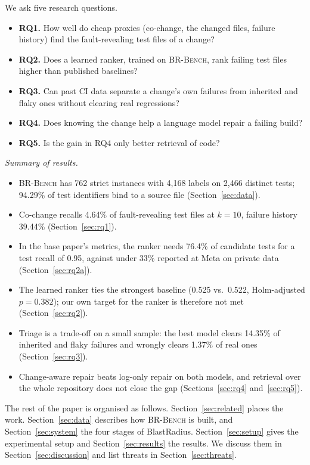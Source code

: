\documentclass[10pt,conference]{IEEEtran}
\newcommand{\brb}{\textsc{BR-Bench}}
\begin{document}
We ask five research questions.
\begin{itemize}
\item \textbf{RQ1.} How well do cheap proxies (co-change, the changed files, failure history) find the fault-revealing test files of a change?
\item \textbf{RQ2.} Does a learned ranker, trained on \brb{}, rank failing test files higher than published baselines?
\item \textbf{RQ3.} Can past CI data separate a change's own failures from inherited and flaky ones without clearing real regressions?
\item \textbf{RQ4.} Does knowing the change help a language model repair a failing build?
\item \textbf{RQ5.} Is the gain in RQ4 only better retrieval of code?
\end{itemize}

\textit{Summary of results.}
\begin{itemize}
\item \brb{} has 762 strict instances with 4,168 labels on 2,466 distinct tests; 94.29\% of test identifiers bind to a source file (Section~\ref{sec:data}).
\item Co-change recalls 4.64\% of fault-revealing test files at $k=10$, failure history 39.44\% (Section~\ref{sec:rq1}).
\item In the base paper's metrics, the ranker needs 76.4\% of candidate tests for a test recall of 0.95, against under 33\% reported at Meta on private data (Section~\ref{sec:rq2a}).
\item The learned ranker ties the strongest baseline (0.525 vs.\ 0.522, Holm-adjusted $p=0.382$); our own target for the ranker is therefore not met (Section~\ref{sec:rq2}).
\item Triage is a trade-off on a small sample: the best model clears 14.35\% of inherited and flaky failures and wrongly clears 1.37\% of real ones (Section~\ref{sec:rq3}).
\item Change-aware repair beats log-only repair on both models, and retrieval over the whole repository does not close the gap (Sections~\ref{sec:rq4} and~\ref{sec:rq5}).
\end{itemize}

The rest of the paper is organised as follows. Section~\ref{sec:related} places the work. Section~\ref{sec:data} describes how \brb{} is built, and Section~\ref{sec:system} the four stages of BlastRadius. Section~\ref{sec:setup} gives the experimental setup and Section~\ref{sec:results} the results. We discuss them in Section~\ref{sec:discussion} and list threats in Section~\ref{sec:threats}.
\end{document}
